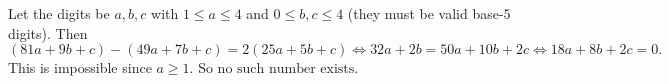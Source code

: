 Let the digits be $a,b,c$ with $1\le a\le4$ and $0\le b,c\le4$ (they must be valid base-$5$ digits). Then
\[(81a+9b+c)-(49a+7b+c)=2(25a+5b+c)\iff32a+2b=50a+10b+2c\iff18a+8b+2c=0.\]
This is impossible since $a\ge1$. So $\boxed{\text{no such number exists}}$.
